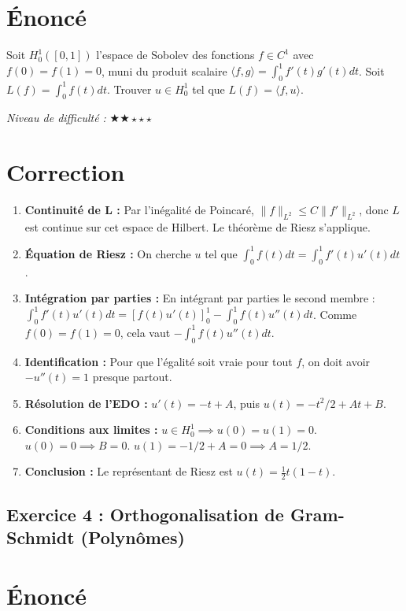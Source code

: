 \documentclass[11pt,a4paper]{article}
\begin{document}
\section{Énoncé}

Soit $H_0^1([0, 1])$ l'espace de Sobolev des fonctions $f \in C^1$ avec $f(0)=f(1)=0$, muni du produit scalaire $\langle f, g \rangle = \int_0^1 f'(t) g'(t) dt$. Soit $L(f) = \int_0^1 f(t) dt$. Trouver $u \in H_0^1$ tel que $L(f) = \langle f, u \rangle$.

\textit{Niveau de difficulté :} $\bigstar\bigstar\star\star\star$

\section{Correction}

\begin{enumerate}
\item \textbf{Continuité de L :} Par l'inégalité de Poincaré, $\|f\|_{L^2} \le C \|f'\|_{L^2}$, donc $L$ est continue sur cet espace de Hilbert. Le théorème de Riesz s'applique.
\item \textbf{Équation de Riesz :} On cherche $u$ tel que $\int_0^1 f(t) dt = \int_0^1 f'(t) u'(t) dt$.
\item \textbf{Intégration par parties :} En intégrant par parties le second membre : $\int_0^1 f'(t) u'(t) dt = [f(t)u'(t)]_0^1 - \int_0^1 f(t) u''(t) dt$. Comme $f(0)=f(1)=0$, cela vaut $-\int_0^1 f(t) u''(t) dt$.
\item \textbf{Identification :} Pour que l'égalité soit vraie pour tout $f$, on doit avoir $-u''(t) = 1$ presque partout.
\item \textbf{Résolution de l'EDO :} $u'(t) = -t + A$, puis $u(t) = -t^2/2 + At + B$.
\item \textbf{Conditions aux limites :} $u \in H_0^1 \implies u(0)=u(1)=0$. $u(0)=0 \implies B=0$. $u(1) = -1/2 + A = 0 \implies A=1/2$.
\item \textbf{Conclusion :} Le représentant de Riesz est $u(t) = \frac{1}{2} t (1-t)$.
\end{enumerate}


\subsection*{Exercice 4 : Orthogonalisation de Gram-Schmidt (Polynômes)}

\section{Énoncé}
\end{document}
